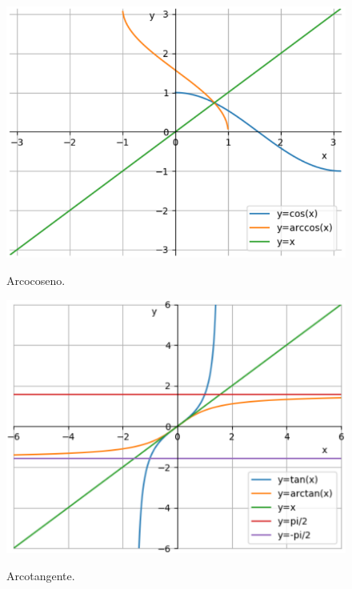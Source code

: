 \begin{figure}[H]
{\includegraphics[width=.90\linewidth]{gfx/4/arcocoseno.png}
}
\caption{Arcocoseno.}\label{fig:arcocoseno}
\end{figure}

\begin{figure}[H]
{\includegraphics[width=.90\linewidth]{gfx/4/arcotangente.png}}
\caption{Arcotangente.}\label{fig:arcotangente}
\end{figure}
